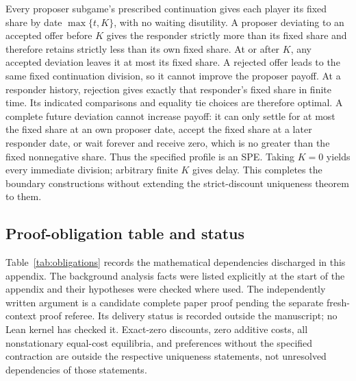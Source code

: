\documentclass[11pt]{article}
\begin{document}
Every proposer subgame's prescribed continuation gives each player its fixed share by date $\max\{t,K\}$, with no waiting disutility. A proposer deviating to an accepted offer before $K$ gives the responder strictly more than its fixed share and therefore retains strictly less than its own fixed share. At or after $K$, any accepted deviation leaves it at most its fixed share. A rejected offer leads to the same fixed continuation division, so it cannot improve the proposer payoff. At a responder history, rejection gives exactly that responder's fixed share in finite time. Its indicated comparisons and equality tie choices are therefore optimal. A complete future deviation cannot increase payoff: it can only settle for at most the fixed share at an own proposer date, accept the fixed share at a later responder date, or wait forever and receive zero, which is no greater than the fixed nonnegative share. Thus the specified profile is an SPE. Taking $K=0$ yields every immediate division; arbitrary finite $K$ gives delay. This completes the boundary constructions without extending the strict-discount uniqueness theorem to them.

\subsection{Proof-obligation table and status}
Table~\ref{tab:obligations} records the mathematical dependencies discharged in this appendix. The background analysis facts were listed explicitly at the start of the appendix and their hypotheses were checked where used. The independently written argument is a candidate complete paper proof pending the separate fresh-context proof referee. Its delivery status is recorded outside the manuscript; no Lean kernel has checked it. Exact-zero discounts, zero additive costs, all nonstationary equal-cost equilibria, and preferences without the specified contraction are outside the respective uniqueness statements, not unresolved dependencies of those statements.
\end{document}
